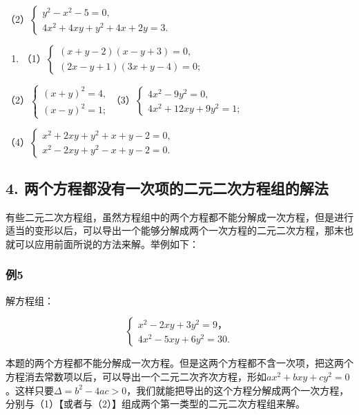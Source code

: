 （2）\(\left\{ \begin{array}{l} y^{2} - x^{2} - 5 = 0, \\ 4x^{2} + 4xy + y^{2} + 4x + 2y = 3. \end{array} \right.\)

\begin{enumerate}[start=4]
\item
  （1）\(\left\{ \begin{array}{l} (x + y - 2)(x - y + 3) = 0, \\ (2x - y + 1)(3x + y - 4) = 0; \end{array} \right.\)
\end{enumerate}

（2）\(\left\{ \begin{array}{l} (x + y)^2 = 4, \\ (x - y)^2 = 1; \end{array} \right.\)（3）\(\left\{ \begin{array}{l} 4x^2 - 9y^2 = 0, \\ 4x^2 + 12xy + 9y^2 = 1; \end{array} \right.\)

（4）\(\left\{ \begin{array}{l} x^{2} + 2xy + y^{2} + x + y - 2 = 0, \\ x^{2} - 2xy + y^{2} - x + y - 2 = 0. \end{array} \right.\)

\subsection{4. 两个方程都没有一次项的二元二次方程组的解法}

有些二元二次方程组，虽然方程组中的两个方程都不能分解成一次方程，但是进行适当的变形以后，可以导出一个能够分解成两个一次方程的二元二次方程，那末也就可以应用前面所说的方法来解。举例如下：

\subsubsection{例5}

解方程组：

\[
\left\{ \begin{array}{l} x^2 - 2xy + 3y^2 = 9\text{，} \\ 4x^2 - 5xy + 6y^2 = 30. \end{array} \right. \tag{1}
\]

本题的两个方程都不能分解成一次方程。但是这两个方程都不含一次项，把这两个方程消去常数项以后，可以导出一个二元二次齐次方程，形如\(ax^2 + bxy + cy^2 = 0\)。这样只要\(\Delta = b^2 - 4ac > 0\)，我们就能把导出的这个方程分解成两个一次方程，分别与（1）【或者与（2）】组成两个第一类型的二元二次方程组来解。

